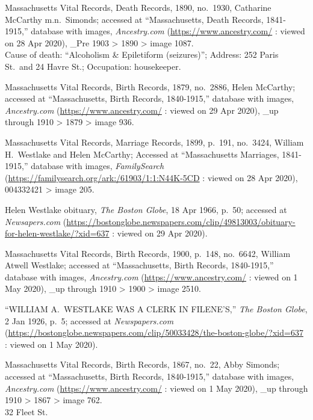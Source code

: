 \begin{thebibliography}{999}
	Massachusetts Vital Records, Death Records, 1890, no.\ 1930, Catharine McCarthy m.n.\ Simonds; accessed at ``Massachusetts, Death Records, 1841-1915,'' database with images, \textit{Ancestry.com} (\url{https://www.ancestry.com/} : viewed on 28 Apr 2020), \_Pre 1903 > 1890 > image 1087.\\
	Cause of death: ``Alcoholism \& Epiletiform (seizures)''; Address: 252 Paris St.\ and 24 Havre St.; Occupation: housekeeper.
	
	Massachusetts Vital Records, Birth Records, 1879, no.\ 2886, Helen McCarthy; accessed at ``Massachusetts, Birth Records, 1840-1915,'' database with images, \textit{Ancestry.com} (\url{https://www.ancestry.com/} : viewed on 29 Apr 2020), \_up through 1910 > 1879 > image 936.
	
	Massachusetts Vital Records, Marriage Records, 1899, p.\ 191, no.\ 3424, William H.\ Westlake and Helen McCarthy; Accessed at ``Massachusetts Marriages, 1841-1915,'' database with images, \textit{FamilySearch} (\url{https://familysearch.org/ark:/61903/1:1:N44K-5CD} : viewed on 28 Apr 2020), 004332421 > image 205.
	
	Helen Westlake obituary, \textit{The Boston Globe}, 18 Apr 1966, p.\ 50; accessed at \textit{Newsapers.com} (\url{https://bostonglobe.newspapers.com/clip/49813003/obituary-for-helen-westlake/?xid=637} : viewed on 29 Apr 2020).
	
	Massachusetts Vital Records, Birth Records, 1900, p.\ 148, no.\ 6642, William Atwell Westlake; accessed at ``Massachusetts, Birth Records, 1840-1915,'' database with images, \textit{Ancestry.com} (\url{https://www.ancestry.com/} : viewed on 1 May 2020), \_up through 1910 > 1900 > image 2510.	
	
	``WILLIAM A.\ WESTLAKE WAS A CLERK IN FILENE'S,'' \textit{The Boston Globe}, 2 Jan 1926, p.\ 5; accessed at \textit{Newspapers.com} (\url{https://bostonglobe.newspapers.com/clip/50033428/the-boston-globe/?xid=637} : viewed on 1 May 2020).

	Massachusetts Vital Records, Birth Records, 1867, no.\ 22, Abby Simonds; accessed at ``Massachusetts, Birth Records, 1840-1915,'' database with images, \textit{Ancestry.com} (\url{https://www.ancestry.com/} : viewed on 1 May 2020), \_up through 1910 > 1867 > image 762.\\
	32 Fleet St.
	

\end{thebibliography}
